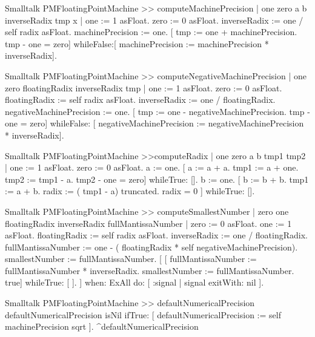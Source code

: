 \begin{displaycode}{Smalltalk}
PMFloatingPointMachine >> computeMachinePrecision
    | one zero a b inverseRadix tmp x |
    one := 1 asFloat.
    zero := 0 asFloat.
    inverseRadix := one / self radix asFloat.
    machinePrecision := one.
    [ tmp := one + machinePrecision.
      tmp - one = zero]
        whileFalse:[  machinePrecision := machinePrecision * inverseRadix].
\end{displaycode}

\begin{displaycode}{Smalltalk}
PMFloatingPointMachine >> computeNegativeMachinePrecision
    | one zero floatingRadix inverseRadix tmp |
    one := 1 asFloat.
    zero := 0 asFloat.
    floatingRadix := self radix asFloat.
    inverseRadix := one / floatingRadix.
    negativeMachinePrecision := one.
    [ tmp := one - negativeMachinePrecision.
      tmp - one = zero]
        whileFalse: [ negativeMachinePrecision := 
                             negativeMachinePrecision * inverseRadix].
\end{displaycode}

\begin{displaycode}{Smalltalk}
PMFloatingPointMachine >>computeRadix
   | one zero a b tmp1 tmp2 |
   one := 1 asFloat.
   zero := 0 asFloat.
   a := one.
   [ a := a + a.
      tmp1 := a + one.
      tmp2 := tmp1 - a.
      tmp2 - one = zero] whileTrue: [].
    b := one.
    [ b := b + b.
      tmp1 := a + b.
      radix := ( tmp1 - a) truncated.
      radix = 0 ] whileTrue: [].
\end{displaycode}

\begin{displaycode}{Smalltalk}
PMFloatingPointMachine >> computeSmallestNumber
    | zero one floatingRadix inverseRadix fullMantissaNumber |
    zero := 0 asFloat.
    one := 1 asFloat.
    floatingRadix := self radix asFloat.
    inverseRadix := one / floatingRadix.
    fullMantissaNumber := one - ( floatingRadix * self negativeMachinePrecision).
    smallestNumber := fullMantissaNumber.
    [ [ fullMantissaNumber := fullMantissaNumber * inverseRadix.
        smallestNumber := fullMantissaNumber.
        true] whileTrue: [ ].
        ] when: ExAll do: [ :signal | signal exitWith: nil ].
\end{displaycode}

\begin{displaycode}{Smalltalk}
PMFloatingPointMachine >> defaultNumericalPrecision
    defaultNumericalPrecision isNil
        ifTrue: [ defaultNumericalPrecision := self machinePrecision sqrt ].
    ^defaultNumericalPrecision
\end{displaycode}

